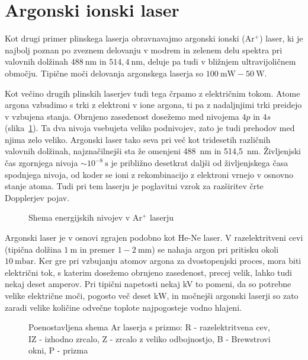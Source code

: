 \section{Argonski ionski laser}
Kot drugi primer plinskega laserja obravnavajmo argonski ionski (Ar$^+$) laser,
ki je najbolj poznan po zveznem delovanju v modrem in zelenem delu spektra pri 
valovnih dolžinah $488~\si{\nano\metre}$ in $514,4~\si{\nano\metre}$, deluje 
pa tudi v bližnjem ultravijoličnem območju. Tipične moči delovanja argonskega laserja
so $100~\si{\milli\watt} - 50~\si{\watt}$.

Kot večino drugih plinskih laserjev tudi tega črpamo z električnim tokom.
Atome argona vzbudimo s trki z elektroni v ione argona, ti pa z nadaljnjimi
trki preidejo v vzbujena stanja. Obrnjeno zasedenost
dosežemo med nivojema $4p$ in $4s$ (slika~\ref{fig:ArE}). 
Ta dva nivoja vsebujeta veliko podnivojev, zato je tudi prehodov med
njima zelo veliko. Argonski laser tako seva pri več kot tridesetih različnih
valovnih dolžinah, najznačilnejši sta že omenjeni 488~nm in 514,5~nm. 
Življenjski čas zgornjega nivoja $\sim 10^{-8}~\si{\second}$ je približno 
desetkrat daljši od življenjskega časa spodnjega nivoja, od koder se ioni
z rekombinacijo z elektroni vrnejo v osnovno stanje atoma. Tudi pri tem laserju
je poglavitni vzrok za razširitev črte Dopplerjev 
pojav.

\begin{figure}[h]
\centering
\def\svgwidth{80truemm} 

\caption{Shema energijskih nivojev v Ar$^+$ laserju}
\label{fig:ArE}
\end{figure}

Argonski laser je v osnovi zgrajen podobno kot He-Ne laser. 
V razelektritveni cevi
(tipična dolžina $1~\si{\metre}$ in premer $1-2~\si{\milli\metre}$)
se nahaja argon pri pritisku okoli $10~\si{\milli\bar}$. Ker gre pri 
vzbujanju atomov argona za dvostopenjski proces, mora biti električni tok, 
s katerim dosežemo obrnjeno zasedenost, precej velik, lahko tudi nekaj deset amperov. 
Pri tipični napetosti nekaj kV to pomeni, da so potrebne velike električne moči, 
pogosto več deset $\si{\kilo\watt}$, in močnejši argonski laserji so zato zaradi 
velike količine odvečne toplote najpogosteje vodno hlajeni.

\begin{figure}[h]
\centering
\def\svgwidth{110truemm} 

\caption{Poenostavljena shema Ar laserja s prizmo: R - razelektritvena cev, 
IZ - izhodno zrcalo, Z - zrcalo z veliko odbojnostjo, B - Brewstrovi okni, 
P - prizma
}
\label{fig:ArS}
\end{figure}


